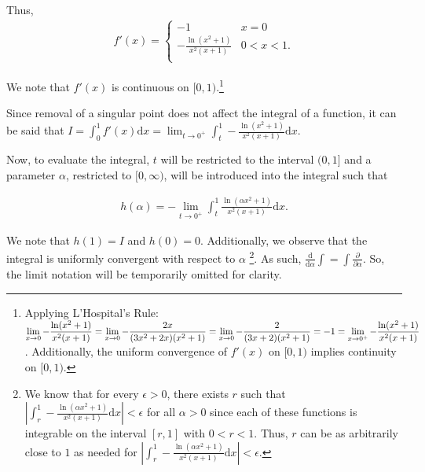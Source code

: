 \documentclass{article}
\begin{document}
Thus, 
\begin{align*}
f'(x)=\begin{cases} 
     -1 & x = 0 \\
     -\frac{\ln(x^2+1)}{x^2(x+1)} & 0 < x < 1.\\
\end{cases}
\end{align*}

We note that $f'(x)$ is continuous on $[0,1)$.\footnote{Applying L'Hospital's Rule: $\displaystyle\lim_{x \to 0}-\frac{\ln(x^2+1)}{x^2(x+1)}=\lim_{x \to 0}-\frac{2x}{(3x^2+2x)(x^2+1)}\newline=\lim_{x \to 0}-\frac{2}{(3x+2)(x^2+1)}=-1=\displaystyle\lim_{x \to 0^{+}}-\frac{\ln(x^2+1)}{x^2(x+1)}$. Additionally, the uniform convergence of $f'(x)$ on $[0,1)$ implies continuity on $[0,1).$}

\vspace{5mm}

Since removal of a singular point does not affect the integral of a function, it can be said that $\displaystyle I= \int_{0}^{1}f'(x)\mathrm{d}x=\lim_{t \to 0^{+}}\int_{t}^{1}-\frac{\ln(x^2+1)}{x^2(x+1)}\mathrm{d}x$.

\vspace{5mm}

Now, to evaluate the integral, $t$ will be restricted to the interval $(0,1]$ and a parameter $\alpha$, restricted to $[0,\infty)$, will be introduced into the integral such that 

\begin{align*}
   h(\alpha)=-\lim_{t \to 0^{+}}\int_{t}^{1}\frac{\ln(\alpha x^2+1)}{x^2(x+1)}\mathrm{d}x.
\end{align*}

We note that $h(1) = I$ and $h(0)=0$. Additionally, we observe that the integral is uniformly convergent with respect to $\alpha$ \footnote{We know that for every $\epsilon > 0$, there exists $r$ such that $\left|\int_{r}^{1}-\frac{\ln(\alpha x^2+1)}{x^2(x+1)}\mathrm{d}x\right| < \epsilon$ for all $\alpha > 0$ since each of these functions is integrable on the interval $[r, 1]$ with $0 < r < 1$. Thus, $r$ can be as arbitrarily close to $1$ as needed for $\left|\int_{r}^{1}-\frac{\ln(\alpha x^2+1)}{x^2(x+1)}\mathrm{d}x\right| < \epsilon$.}. As such, $\frac{\mathrm{d}}{\mathrm{d}\alpha}\int=\int\frac{\partial}{\partial\alpha}$. So, the limit notation will be temporarily omitted for clarity. 

\vspace{5mm}
\end{document}

